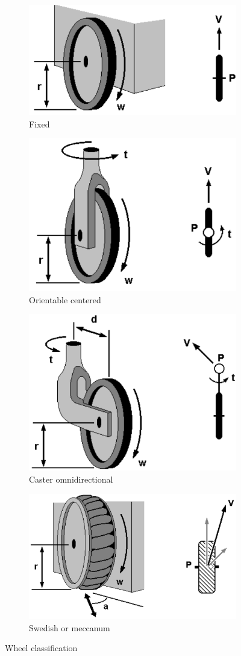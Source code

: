 \begin{figure}[H]
    \centering
    \begin{subfigure}{0.49\textwidth}
        \centering
        \includegraphics[width=0.5\linewidth]{images/fixed.png} 
        \caption{Fixed}
    \end{subfigure}
    \begin{subfigure}{0.49\textwidth}
        \centering
        \includegraphics[width=0.5\linewidth]{images/oc.png}
        \caption{Orientable centered}
    \end{subfigure}
    \begin{subfigure}{0.49\textwidth}
        \centering
        \includegraphics[width=0.5\linewidth]{images/co.png} 
        \caption{Caster omnidirectional}
    \end{subfigure}
    \begin{subfigure}{0.49\textwidth}
        \centering
        \includegraphics[width=0.5\linewidth]{images/sm.png}
        \caption{Swedish or meccanum}
    \end{subfigure}
    \caption{Wheel classification}
\end{figure}

